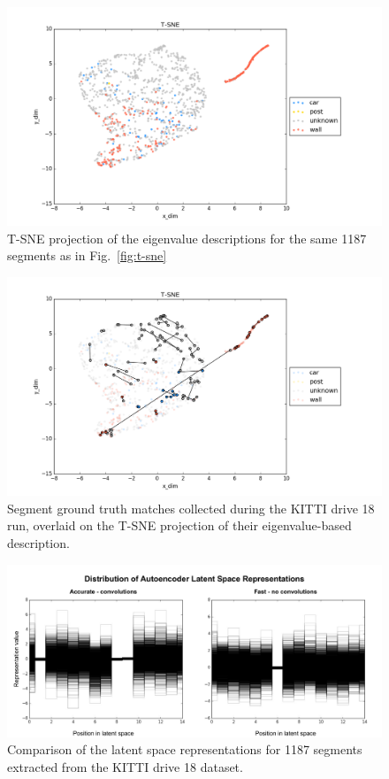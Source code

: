 \begin{figure}
  \centering
  \includegraphics[width=5.2in]{images/t-sne_eig.png}
\caption{T-SNE projection of the eigenvalue descriptions for the same 1187 segments as in Fig.~\ref{fig:t-sne}}
  \label{fig:tsne_eig}
\end{figure}

\begin{figure}
  \centering
  \includegraphics[width=5.2in]{images/t-sne_matches_eig.png}
\caption{Segment ground truth matches collected during the KITTI drive 18 run, overlaid on the T-SNE projection of their eigenvalue-based description.}
  \label{fig:tsne_matches_eig}
\end{figure}

\begin{figure}
  \centering
  \includegraphics[width=5.2in]{images/fastvaccuratefeatures.pdf}
  \caption{Comparison of the latent space representations for 1187 segments extracted from the KITTI drive 18 dataset.}
  \label{fig:fastvaccurate_features}
\end{figure}

